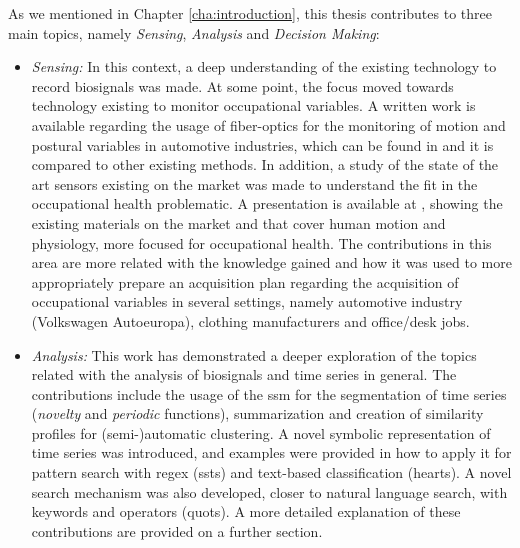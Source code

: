 As we mentioned in Chapter \ref{cha:introduction}, this thesis contributes to three main topics, namely \textit{Sensing}, \textit{Analysis} and \textit{Decision Making}:
\begin{itemize}
\item \textit{Sensing:} In this context, a deep understanding of the existing technology to record biosignals was made. At some point, the focus moved towards technology existing to monitor occupational variables. A written work is available regarding the usage of fiber-optics for the monitoring of motion and postural variables in automotive industries, which can be found in \cite{fiber_optics} and it is compared to other existing methods. In addition, a study of the state of the art sensors existing on the market was made to understand the fit in the occupational health problematic. A presentation is available at \cite{sensors_slides}, showing the existing materials on the market and that cover human motion and physiology, more focused for occupational health. The contributions in this area are more related with the knowledge gained and how it was used to more appropriately prepare an acquisition plan regarding the acquisition of occupational variables in several settings, namely automotive industry (Volkswagen Autoeuropa), clothing manufacturers and office/desk jobs.\\

\item \textit{Analysis:} This work has demonstrated a deeper exploration of the topics related with the analysis of biosignals and time series in general. The contributions include the usage of the \gls{ssm} for the segmentation of time series (\textit{novelty} and \textit{periodic} functions), summarization and creation of similarity profiles for (semi-)automatic clustering. A novel symbolic representation of time series was introduced, and examples were provided in how to apply it for pattern search with \gls{regex} (\gls{ssts}) and text-based classification (\gls{hearts}). A novel search mechanism was also developed, closer to natural language search, with keywords and operators (\gls{quots}). A more detailed explanation of these contributions are provided on a further section.\\


\end{itemize}
